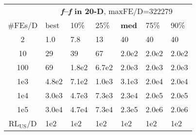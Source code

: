 \begin{tabular}{c|llllll}
 & \multicolumn{6}{|c}{\textbf{\textit{f}\raisebox{-0.35ex}{1}--\textit{f}\raisebox{-0.35ex}{24} in 20-D}, maxFE/D=322279}\\
\#FEs/D & best & 10\% & 25\% & \textbf{med} & 75\% & 90\%\\
2 & \hspace*{1ex}1.0 & \hspace*{1ex}7.8 & 13 & 40 & 40 & 40\\
10 & 29 & 39 & 67 & 2.0e2 & 2.0e2 & 2.0e2\\
100 & 69 & 1.8e2 & 6.7e2 & 2.0e3 & 2.0e3 & 2.0e3\\
1e3 & 4.8e2 & 7.1e2 & 1.0e3 & 3.1e3 & 2.0e4 & 2.0e4\\
1e4 & 3.0e3 & 4.7e3 & 7.3e3 & 2.3e4 & 2.0e5 & 2.0e5\\
1e5 & 3.0e4 & 4.7e4 & 7.3e4 & 2.3e5 & 2.0e6 & 2.0e6\\
$\text{RL}_{\text{US}}$/D & 1e2 & 1e2 & 1e2 & 1e2 & 1e2 & 1e2
\end{tabular}
